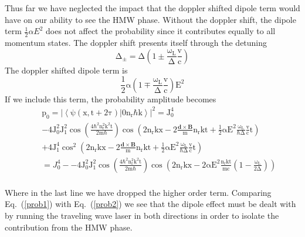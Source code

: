 \documentclass[twocolumn,english,pra,aps,superscriptaddress,floatfix]{revtex4-1}
\begin{document}
Thus far we have neglected the impact that the doppler shifted dipole term would have on our ability to see the HMW phase.  Without the doppler shift, the dipole term $\frac{1}{2}\alpha E^2$ does not affect the probability since it contributes equally to all momentum states.  The doppler shift presents itself through the detuning 
\begin{equation}
\mathrm{\Delta_{\pm}=\Delta\left(1\pm \frac{\omega_{L}}{\Delta}\frac{v}{c}\right)}
\end{equation}
The doppler shifted dipole term is
\begin{equation}
\mathrm{\frac{1}{2}\alpha\left(1\mp \frac{\omega_{L}}{\Delta}\frac{v}{c}\right)E^2}
\end{equation}
If we include this term, the probability amplitude becomes
\begin{eqnarray}
&&\mathrm{p_0=|\left<\psi(x,t+2\tau)|0n_r\hbar k\right>|^2=J_0^4}\nonumber \\
&&\mathrm{-4J_0^2J_1^2\cos{\left(\frac{4\hbar^2n_r^2k^2t}{2m\hbar}\right)}\cos{\left(2n_rkx-2\frac{\mathbf{d}\times\mathbf{B}}{m}n_rkt+\frac{1}{2}\alpha E^2\frac{\omega_L}{\hbar \Delta}\frac{v}{c}t\right)}} \nonumber \\
&&\mathrm{+4J_1^4\cos^2{\left(2n_rkx-2\frac{\mathbf{d}\times\mathbf{B}}{m}n_rkt+\frac{1}{2}\alpha E^2\frac{\omega_L}{\hbar \Delta}\frac{v}{c}t\right)}} \nonumber \\
&&=J_0^4-\mathrm{-4J_0^2J_1^2\cos{\left(\frac{4\hbar^2n_r^2k^2t}{2m\hbar}\right)}\cos{\left(2n_rkx-2\alpha E^2\frac{n_rkt}{mc}\left(1-\frac{\omega_L}{2\Delta}\right)\right)}} \nonumber \\
\label{prob2}
\end{eqnarray}

Where in the last line we have dropped the higher order term. Comparing  Eq.\ (\ref{prob1}) with  Eq.\ (\ref{prob2}) we see that the dipole effect must be dealt with by running the traveling wave laser in both directions in order to isolate the contribution from the HMW phase.
\vspace{5mm}
 
\end{document}
